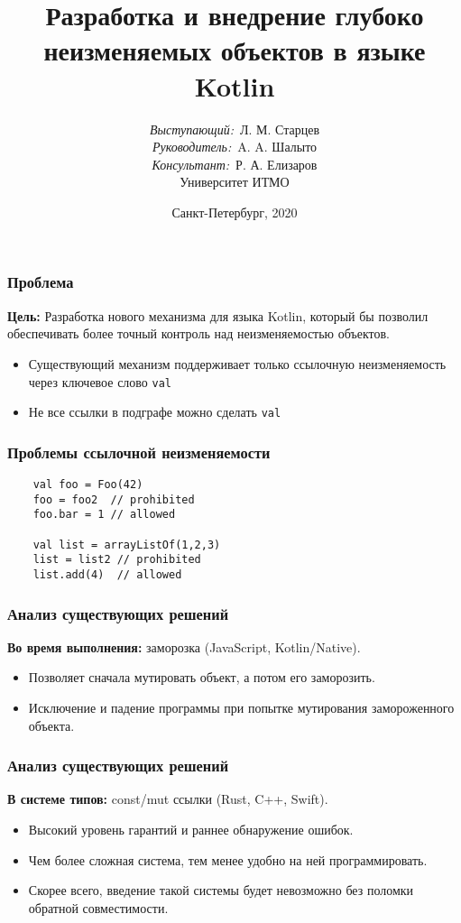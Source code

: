 \documentclass[14pt,xcolor={dvipsnames}]{beamer}
\title{\small{Разработка и внедрение глубоко неизменяемых объектов в языке Kotlin}}
\author{\small{%
\emph{Выступающий:}~Л. М. Старцев\\%
\emph{Руководитель:}~A. A. Шалыто\\%
\emph{Консультант:}~Р. А. Елизаров}\\%
\vspace{30pt}%
Университет ИТМО%
\vspace{20pt}%
}
\date{\small{Санкт-Петербург, 2020}}
\begin{document}
\maketitle

\begin{frame}
\frametitle{Проблема}
\textbf{Цель:} Разработка нового механизма для языка Kotlin, который бы позволил обеспечивать более точный контроль над неизменяемостью объектов.%

\begin{itemize}
  \item Существующий механизм поддерживает только ссылочную неизменяемость через ключевое слово \texttt{val}
  \item Не все ссылки в подграфе можно сделать \texttt{val}
\end{itemize}
\end{frame}

\begin{frame}[fragile]
\frametitle{\large Проблемы ссылочной неизменяемости}
\begin{lstlisting}
	val foo = Foo(42)
	foo = foo2  // prohibited
	foo.bar = 1 // allowed
	
	val list = arrayListOf(1,2,3)
	list = list2 // prohibited
	list.add(4)  // allowed
\end{lstlisting}
\end{frame}

\begin{frame}
\frametitle{Анализ существующих решений}
\textbf{Во время выполнения:} заморозка (JavaScript, Kotlin/Native).%

\begin{itemize}
  \item Позволяет сначала мутировать объект, а потом его заморозить.
  \item Исключение и падение программы при попытке мутирования замороженного объекта.
\end{itemize}
\end{frame}

\begin{frame}
\frametitle{Анализ существующих решений}
\textbf{В системе типов:} const/mut ссылки (Rust, C++, Swift).%

\begin{itemize}
  \item Высокий уровень гарантий и раннее обнаружение ошибок.
  \item Чем более сложная система, тем менее удобно на ней программировать.
  \item Скорее всего, введение такой системы будет невозможно без поломки обратной совместимости.
\end{itemize}
\end{frame}
\end{document}
